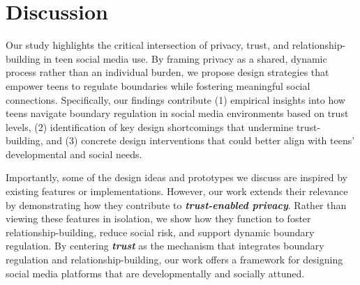 \section{Discussion}
Our study highlights the critical intersection of privacy, trust, and relationship-building in teen social media use. By framing privacy as a shared, dynamic process rather than an individual burden, we propose design strategies that empower teens to regulate boundaries while fostering meaningful social connections. Specifically, our findings contribute (1) empirical insights into how teens navigate boundary regulation in social media environments based on trust levels, (2) identification of key design shortcomings that undermine trust-building, and (3) concrete design interventions that could better align with teens' developmental and social needs. 

Importantly, some of the design ideas and prototypes we discuss are inspired by existing features or implementations. However, our work extends their relevance by demonstrating how they contribute to \textit{\textbf{trust-enabled privacy}}. Rather than viewing these features in isolation, we show how they function to foster relationship-building, reduce social risk, and support dynamic boundary regulation. By centering \textbf{\textit{trust}} as the mechanism that integrates boundary regulation and relationship-building, our work offers a framework for designing social media platforms that are developmentally and socially attuned.


